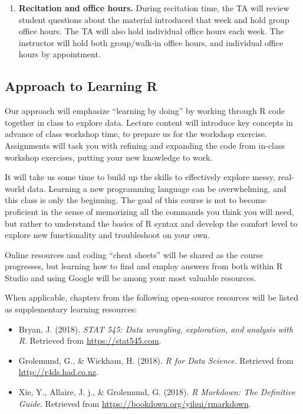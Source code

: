 \documentclass[11pt,]{article}
\providecommand{\tightlist}{%
  \setlength{\itemsep}{0pt}\setlength{\parskip}{0pt}}
\begin{document}
\begin{enumerate}
  (if applicable), insert code, screenshots, and text to your posts. The
  teaching team will do our best to reply within 48-72 hours, but you
  are all encouraged to share your thoughts/answers on posts by your
  classmates. Writing out explanations to student questions will improve
  your own knowledge and benefit your classmates. Thoughtful
  contributions will also count towards your overall class
  participation.
\item
  \textbf{Recitation and office hours.} During recitation time, the TA
  will review student questions about the material introduced that week
  and hold group office hours. The TA will also hold individual office
  hours each week. The instructor will hold both group/walk-in office
  hours, and individual office hours by appointment.
\end{enumerate}

\hypertarget{approach-to-learning-r}{%
\subsection{Approach to Learning R}\label{approach-to-learning-r}}

Our approach will emphasize ``learning by doing'' by working through R
code together in class to explore data. Lecture content will introduce
key concepts in advance of class workshop time, to prepare us for the
workshop exercise. Assignments will task you with refining and expanding
the code from in-class workshop exercises, putting your new knowledge to
work.

It will take us some time to build up the skills to effectively explore
messy, real-world data. Learning a new programming language can be
overwhelming, and this class is only the beginning. The goal of this
course is not to become proficient in the sense of memorizing all the
commands you think you will need, but rather to understand the basics of
R syntax and develop the comfort level to explore new functionality and
troubleshoot on your own.

Online resources and coding ``cheat sheets'' will be shared as the
course progresses, but learning how to find and employ answers from both
within R Studio and using Google will be among your most valuable
resources.

When applicable, chapters from the following open-source resources will
be listed as supplementary learning resources:

\begin{itemize}
\tightlist
\item
  Bryan, J. (2018). \emph{STAT 545: Data wrangling, exploration, and
  analysis with R}. Retrieved from \url{https://stat545.com}.
\item
  Grolemund, G., \& Wickham, H. (2018). \emph{R for Data Science}.
  Retrieved from \url{http://r4ds.had.co.nz}.
\item
  Xie, Y., Allaire, J. j., \& Grolemund, G. (2018). \emph{R Markdown:
  The Definitive Guide}. Retrieved from
  \url{https://bookdown.org/yihui/rmarkdown}.
\end{itemize}
\end{document}
